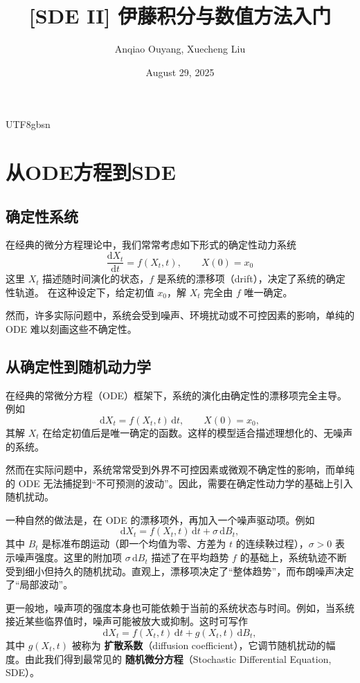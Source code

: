 \documentclass{article}
\title{[SDE II] 伊藤积分与数值方法入门}
\author{Anqiao Ouyang, Xuecheng Liu}
\date{August 29, 2025}
\begin{document}
\begin{CJK*}{UTF8}{gbsn}

\maketitle

\section{从ODE方程到SDE}
\subsection{确定性系统}

在经典的微分方程理论中，我们常常考虑如下形式的确定性动力系统
\[
  \frac{\mathrm{d}X_t}{\mathrm{d}t} = f(X_t,t), \qquad X(0)=x_0
\]
这里 $X_t$ 描述随时间演化的状态，$f$ 是系统的漂移项（drift），决定了系统的确定性轨道。
在这种设定下，给定初值 $x_0$，解 $X_t$ 完全由 $f$ 唯一确定。

然而，许多实际问题中，系统会受到噪声、环境扰动或不可控因素的影响，单纯的 ODE 难以刻画这些不确定性。

\subsection{从确定性到随机动力学}

在经典的常微分方程（ODE）框架下，系统的演化由确定性的漂移项完全主导。例如
\[
  \mathrm{d}X_t = f(X_t,t)\,\mathrm{d}t, \qquad X(0)=x_0,
\]
其解 $X_t$ 在给定初值后是唯一确定的函数。这样的模型适合描述理想化的、无噪声的系统。

然而在实际问题中，系统常常受到外界不可控因素或微观不确定性的影响，而单纯的 ODE 无法捕捉到“不可预测的波动”。因此，需要在确定性动力学的基础上引入随机扰动。

\medskip
一种自然的做法是，在 ODE 的漂移项外，再加入一个噪声驱动项。例如
\[
  \mathrm{d}X_t = f(X_t,t)\,\mathrm{d}t + \sigma\,\mathrm{d}B_t,
\]
其中 $B_t$ 是标准布朗运动（即一个均值为零、方差为 $t$ 的连续鞅过程），$\sigma>0$ 表示噪声强度。这里的附加项 $\sigma\,\mathrm{d}B_t$ 描述了在平均趋势 $f$ 的基础上，系统轨迹不断受到细小但持久的随机扰动。直观上，漂移项决定了“整体趋势”，而布朗噪声决定了“局部波动”。

更一般地，噪声项的强度本身也可能依赖于当前的系统状态与时间。例如，当系统接近某些临界值时，噪声可能被放大或抑制。这时可写作
\[
  \mathrm{d}X_t = f(X_t,t)\,\mathrm{d}t + g(X_t,t)\,\mathrm{d}B_t,
\]
其中 $g(X_t,t)$ 被称为 \textbf{扩散系数}（diffusion coefficient），它调节随机扰动的幅度。由此我们得到最常见的 \textbf{随机微分方程}（Stochastic Differential Equation, SDE）。


\end{CJK*}
\end{document}
